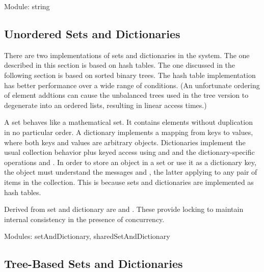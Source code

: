 \documentclass[letterpaper,10pt,english]{sphinxmanual}
\begin{document}
Module: string


\subsection{Unordered Sets and Dictionaries}
\label{\detokenize{collections:unordered-sets-and-dictionaries}}
\begin{sphinxVerbatim}[commandchars=\\\{\}]
\end{sphinxVerbatim}

There are two implementations of sets and dictionaries in the system. The one described in this
section is based on hash tables. The one discussed in the following section is based on sorted binary
trees. The hash table implementation has better performance over a wide range of conditions.
(An unfortunate ordering of element addtions can cause the unbalanced trees used in the tree version
to degenerate into an ordered lists, resulting in linear access times.)

A set behaves like a mathematical set. It contains elements without duplication in no particular order.
A dictionary implements a mapping from keys to values, where both keys and values are arbitrary
objects. Dictionaries implement the usual collection behavior plus keyed access using 
and  and the dictionary-specific operations  and . In order
to store an object in a set or use it as a dictionary key, the object must understand the messages
 and \sphinxcode{=}, the latter applying to any pair of items in the collection. This is because sets and dictionaries
are implemented as hash tables.

Derived from set and dictionary are  and . These provide locking
to maintain internal consistency in the presence of concurrency.

Modules: setAndDictionary, sharedSetAndDictionary


\subsection{Tree-Based Sets and Dictionaries}
\label{\detokenize{collections:tree-based-sets-and-dictionaries}}
\begin{sphinxVerbatim}[commandchars=\\\{\}]
         
             
             
         
             
             
\end{sphinxVerbatim}
\end{document}
